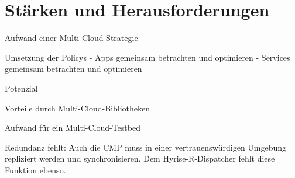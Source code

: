 \section{Stärken und Herausforderungen}



Aufwand einer Multi-Cloud-Strategie

Umsetzung der Policys
- Apps gemeinsam betrachten und optimieren
- Services gemeinsam betrachten und optimieren

Potenzial

Vorteile durch Multi-Cloud-Bibliotheken

Aufwand für ein Multi-Cloud-Testbed

Redundanz fehlt: Auch die CMP muss in einer vertrauenswürdigen Umgebung repliziert werden und synchronisieren. Dem Hyrise-R-Dispatcher fehlt diese Funktion ebenso.

